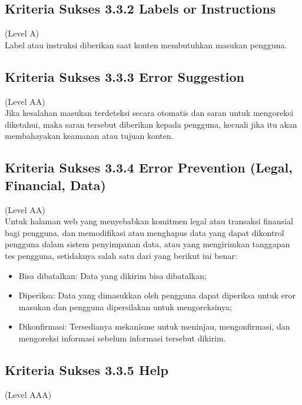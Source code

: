 \subsection{Kriteria Sukses 3.3.2 Labels or Instructions}
\label{subsec:kriteria_3.3.2}
(Level A) \\

Label atau instruksi diberikan saat konten membutuhkan masukan pengguna.

\subsection{Kriteria Sukses 3.3.3 Error Suggestion}
\label{subsec:kriteria_3.3.3}
(Level AA) \\

Jika kesalahan masukan terdeteksi secara otomatis dan saran untuk mengoreksi diketahui, maka saran tersebut diberikan kepada pengguna, kecuali jika itu akan membahayakan keamanan atau tujuan konten.

\subsection{Kriteria Sukses 3.3.4 Error Prevention (Legal, Financial, Data)}
\label{subsec:kriteria_3.3.4}
(Level AA) \\

Untuk halaman web yang menyebabkan komitmen legal atau transaksi finansial bagi pengguna, dan memodifikasi atau menghapus data yang dapat dikontrol pengguna dalam sistem penyimpanan data, atau yang mengirimkan tanggapan tes pengguna, setidaknya salah satu dari yang berikut ini benar:

\begin{itemize}
	\item Bisa dibatalkan: Data yang dikirim bisa dibatalkan;
	\item Diperiksa: Data yang dimasukkan oleh pengguna dapat diperiksa untuk eror masukan dan pengguna dipersilakan untuk mengoreksinya;
	\item Dikonfirmasi: Tersedianya mekanisme untuk meninjau, mengonfirmasi, dan mengoreksi informasi sebelum informasi tersebut dikirim.
\end{itemize}


\subsection{Kriteria Sukses 3.3.5 Help}
\label{subsec:kriteria_3.3.5}
(Level AAA) \\

